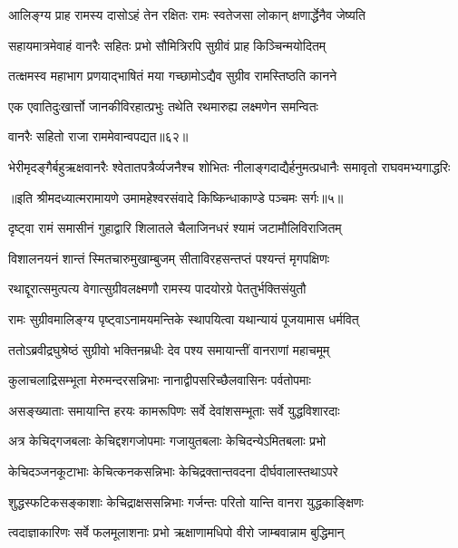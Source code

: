 \twolineshloka
{आलिङ्ग्य प्राह रामस्य दासोऽहं तेन रक्षितः}
{रामः स्वतेजसा लोकान् क्षणार्द्धेनैव जेष्यति} %

\twolineshloka
{सहायमात्रमेवाहं वानरैः सहितः प्रभो}
{सौमित्रिरपि सुग्रीवं प्राह किञ्चिन्मयोदितम्} %

\twolineshloka
{तत्क्षमस्व महाभाग प्रणयाद्भाषितं मया}
{गच्छामोऽद्यैव सुग्रीव रामस्तिष्ठति कानने} %

\twolineshloka
{एक एवातिदुःखार्त्तो जानकीविरहात्प्रभुः}
{तथेति रथमारुह्य लक्ष्मणेन समन्वितः} %

{वानरैः सहितो राजा राममेवान्वपद्यत॥६२॥} %


\twolineshloka
{भेरीमृदङ्गैर्बहुऋक्षवानरैः श्वेतातपत्रैर्व्यजनैश्च शोभितः}
{नीलाङ्गदाद्यैर्हनुमत्प्रधानैः समावृतो राघवमभ्यगाद्धरिः} %

{॥इति श्रीमदध्यात्मरामायणे उमामहेश्वरसंवादे किष्किन्धाकाण्डे
पञ्चमः सर्गः॥५॥
}




\twolineshloka
{दृष्ट्वा रामं समासीनं गुहाद्वारि शिलातले}
{चैलाजिनधरं श्यामं जटामौलिविराजितम्} %

\twolineshloka
{विशालनयनं शान्तं स्मितचारुमुखाम्बुजम्}
{सीताविरहसन्तप्तं पश्यन्तं मृगपक्षिणः} %

\twolineshloka
{रथाद्दूरात्समुत्पत्य वेगात्सुग्रीवलक्ष्मणौ}
{रामस्य पादयोरग्रे पेततुर्भक्तिसंयुतौ} %

\twolineshloka
{रामः सुग्रीवमालिङ्ग्य पृष्ट्वाऽनामयमन्तिके}
{स्थापयित्वा यथान्यायं पूजयामास धर्मवित्} %

\twolineshloka
{ततोऽब्रवीद्रघुश्रेष्ठं सुग्रीवो भक्तिनम्रधीः}
{देव पश्य समायान्तीं वानराणां महाचमूम्} %

\twolineshloka
{कुलाचलाद्रिसम्भूता मेरुमन्दरसन्निभाः}
{नानाद्वीपसरिच्छैलवासिनः पर्वतोपमाः} %

\twolineshloka
{असङ्ख्याताः समायान्ति हरयः कामरूपिणः}
{सर्वे देवांशसम्भूताः सर्वे युद्धविशारदाः} %

\twolineshloka
{अत्र केचिद्गजबलाः केचिद्दशगजोपमाः}
{गजायुतबलाः केचिदन्येऽमितबलाः प्रभो} %

\twolineshloka
{केचिदञ्जनकूटाभाः केचित्कनकसन्निभाः}
{केचिद्रक्तान्तवदना दीर्घवालास्तथाऽपरे} %

\twolineshloka
{शुद्धस्फटिकसङ्काशाः केचिद्राक्षससन्निभाः}
{गर्जन्तः परितो यान्ति वानरा युद्धकाङ्क्षिणः} %

\twolineshloka
{त्वदाज्ञाकारिणः सर्वे फलमूलाशनाः प्रभो}
{ऋक्षाणामधिपो वीरो जाम्बवान्नाम बुद्धिमान्} %

